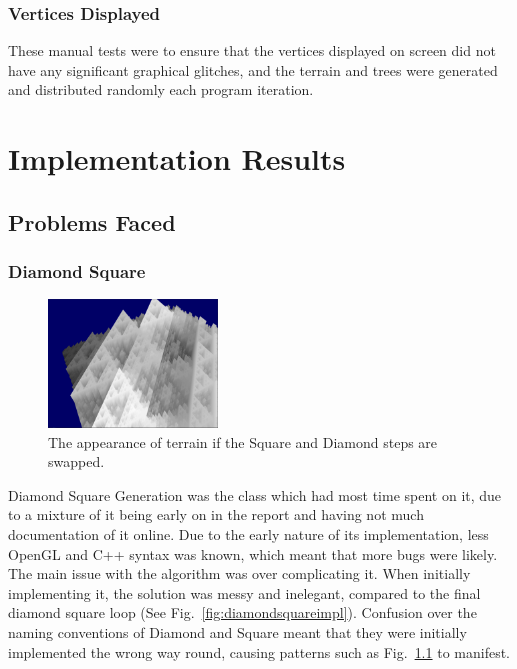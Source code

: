 \documentclass[a4paper,10pt]{report}
\begin{document}
\subsection{Vertices Displayed}

These manual tests were to ensure that the vertices displayed on screen did not have any significant graphical glitches, and the terrain and trees were generated and distributed randomly each program iteration.

\chapter{Implementation Results}
\section{Problems Faced}
\subsection{Diamond Square}

\begin{figure}[h!]
    \centering
  \includegraphics[width=0.4\textwidth]{Images/Screenshots/Glitch.png}
 \caption{The appearance of terrain if the Square and Diamond steps are swapped.}
 \label{fig:glitch}
\end{figure}

Diamond Square Generation was the class which had most time spent on it, due to a mixture of it being early on in the report and having not much documentation of it online. Due to the early nature of its implementation, less OpenGL and C++ syntax was known, which meant that more bugs were likely. The main issue with the algorithm was over complicating it. When initially implementing it, the solution was messy and inelegant, compared to the final diamond square loop (See Fig.~\ref{fig:diamondsquareimpl}). Confusion over the naming conventions of Diamond and Square meant that they were initially implemented the wrong way round, causing patterns such as Fig.~\ref{fig:glitch} to manifest. \medskip
\clearpage
\end{document}
